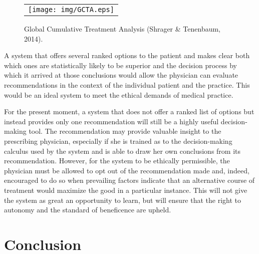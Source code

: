 \documentclass[]{spie}  %
\begin{document}

   \begin{figure}
   \begin{center}
   \begin{tabular}{c}
   \texttt{[image: img/GCTA.eps]}
   \end{tabular}
   \end{center}
   \caption[example]
   { \label{fig:example}
Global Cumulative Treatment Analysis (Shrager \& Tenenbaum, 2014).
}
   \end{figure}


A system that offers several ranked options to the patient and makes clear both which ones are statistically likely to be superior and the decision process by which it arrived at those conclusions would allow the physician can evaluate recommendations in the context of the individual patient and the practice. This would be an ideal system to meet the ethical demands of medical practice.

For the present moment, a system that does not offer a ranked list of options but instead provides only one recommendation will still be a highly useful decision-making tool. The recommendation may provide valuable insight to the prescribing physician, especially if she is trained as to the decision-making calculus used by the system and is able to draw her own conclusions from its recommendation. However, for the system to be ethically permissible, the physician must be allowed to opt out of the recommendation made and, indeed, encouraged to do so when prevailing factors indicate that an alternative course of treatment would maximize the good in a particular instance. This will not give the system as great an opportunity to learn, but will ensure that the right to autonomy and the standard of beneficence are upheld.


\section{Conclusion}
\end{document}
